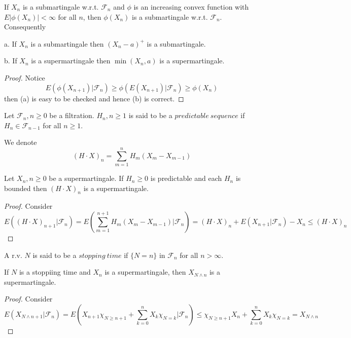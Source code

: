 \documentclass[lang=en, color=blue, ]{elegantbook}
\newcommand{\F}{\mathcal{F}}
\begin{document}
\begin{theorem}
    If $X_n$ is a submartingale w.r.t. $\F_n$ and $\phi$ is an increasing convex function with $E|\phi(X_n)| < \infty$ for all $n$, then $\phi(X_n)$ is a submartingale w.r.t. $\F_n$. Consequently\par
    a. If $X_n$ is a submartingale then $(X_n-a)^+$ is a submartingale.\par
    b. If $X_n$ is a supermartingale then $\min(X_n,a)$ is a supermartingale.
\end{theorem}
\begin{proof}
    Notice
    \[E(\phi(X_{n+1})|\F_n) \geq \phi(E(X_{n+1})|\F_n) \geq \phi(X_n)\]
    then (a) is easy to be checked and hence (b) is correct.
\end{proof}

\begin{definition}
    Let $\F_n, n\geq 0$ be a filtration. $H_n, n\geq 1$ is said to be a $predictable\ sequence$ if $H_n\in\F_{n-1}$ for all $n\geq 1$.
\end{definition}

\begin{definition}
    We denote
    \[(H\cdot X)_n = \sum\limits_{m=1}^n H_m(X_m-X_{m-1})\]
\end{definition}

\begin{theorem}
    Let $X_n, n\geq 0$ be a supermartingale. If $H_n\geq 0$ is predictable and each $H_n$ is bounded then $(H\cdot X)_n$ is a supermartingale.
\end{theorem}
\begin{proof}
    Consider
    \[E((H\cdot X)_{n+1}|\F_n) = E(\sum\limits_{m=1}^{n+1} H_m(X_m-X_{m-1})|\F_n) = (H\cdot X)_n + E(X_{n+1}|\F_n) - X_n \leq (H\cdot X)_n\]
\end{proof}

\begin{definition}
    A r.v. $N$ is said to be a $stopping\ time$ if $\{N=n\}$ in $\F_n$ for all $n>\infty$.
\end{definition}
\begin{theorem}
    If $N$ is a stoppiing time and $X_n$ is a supermartingale, then $X_{N\wedge n}$ is a supermartingale.
\end{theorem}
\begin{proof}
    Consider
    \[E(X_{N\wedge n+1}|\F_n) = E(X_{n+1}\chi_{N\geq n+1}+\sum\limits_{k=0}^nX_{k}\chi_{N = k}|\F_n) \leq \chi_{N\geq n+1} X_n + \sum\limits_{k=0}^nX_{k}\chi_{N = k} = X_{N\wedge n}\]
\end{proof}
\end{document}
